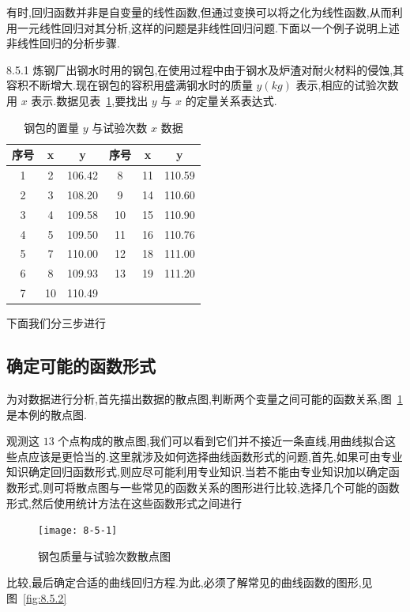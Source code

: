 有时,回归函数并非是自变量的线性函数,但通过变换可以将之化为线性函数,从而利用一元线性回归对其分析,这样的问题是非线性回归问题.下面以一个例子说明上述非线性回归的分析步骤.
\begin{example}{}{8.5.1}
    炼钢厂出钢水时用的钢包,在使用过程中由于钢水及炉渣对耐火材料的侵蚀,其容积不断增大.现在钢包的容积用盛满钢水时的质量 $y(kg)$ 表示,相应的试验次数用 $x$ 表示.数据见表~\ref{tab:8.5.1},要找出 $y$ 与 $x$ 的定量关系表达式.
    \begin{table}[htbp]
        \centering
        \caption{钢包的置量 $y$ 与试验次数 $x$ 数据}
        \begin{tabular}{ccc||ccc}
            \toprule
            序号    & x     & y     & 序号    & x     & y \\\midrule
            1     & 2     & 106.42  & 8     & 11    & 110.59  \\
            2     & 3     & 108.20  & 9     & 14    & 110.60  \\
            3     & 4     & 109.58  & 10    & 15    & 110.90  \\
            4     & 5     & 109.50  & 11    & 16    & 110.76  \\
            5     & 7     & 110.00  & 12    & 18    & 111.00  \\
            6     & 8     & 109.93  & 13    & 19    & 111.20  \\
            7     & 10    & 110.49  &       &       &  \\\bottomrule
        \end{tabular}%
        \label{tab:8.5.1}%
    \end{table}%
    下面我们分三步进行
    
    \subsection{确定可能的函数形式}
    
    为对数据进行分析,首先描出数据的散点图,判断两个变量之间可能的函数关系,图~\ref{fig:8.5.1}是本例的散点图.
    
    观测这 $13$ 个点构成的散点图,我们可以看到它们并不接近一条直线,用曲线拟合这些点应该是更恰当的.这里就涉及如何选择曲线函数形式的问题,首先,如果可由专业知识确定回归函数形式,则应尽可能利用专业知识.当若不能由专业知识加以确定函数形式,则可将散点图与一些常见的函数关系的图形进行比较,选择几个可能的函数形式,然后使用统计方法在这些函数形式之间进行
    \begin{figure}[hb]
        \centering
        \texttt{[image: 8-5-1]}
        \caption{钢包质量与试验次数散点图}
        \label{fig:8.5.1}
    \end{figure}
    比较,最后确定合适的曲线回归方程.为此,必须了解常见的曲线函数的图形,见图~\ref{fig:8.5.2}
    

\end{example}
